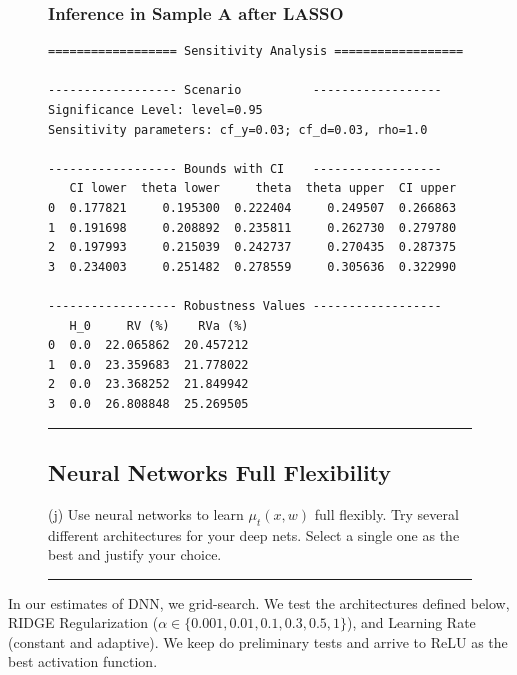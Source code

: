 \documentclass{article}
\newenvironment{colorparagraph}[1]{\par\color{#1}}{\par}
\begin{document}
\begin{figure}[H]
  \subsubsection*{Inference in Sample A after LASSO}
  \begin{lstlisting}[style=RstyleCommentSmall, caption=Sensitivity Analysis in Random Forest Estimate]
================== Sensitivity Analysis ==================

------------------ Scenario          ------------------
Significance Level: level=0.95
Sensitivity parameters: cf_y=0.03; cf_d=0.03, rho=1.0

------------------ Bounds with CI    ------------------
   CI lower  theta lower     theta  theta upper  CI upper
0  0.177821     0.195300  0.222404     0.249507  0.266863
1  0.191698     0.208892  0.235811     0.262730  0.279780
2  0.197993     0.215039  0.242737     0.270435  0.287375
3  0.234003     0.251482  0.278559     0.305636  0.322990

------------------ Robustness Values ------------------
   H_0     RV (%)    RVa (%)
0  0.0  22.065862  20.457212
1  0.0  23.359683  21.778022
2  0.0  23.368252  21.849942
3  0.0  26.808848  25.269505
  \end{lstlisting}
\end{figure}

\begin{figure}[H]
\begin{colorparagraph}{questioncolor}
\label{q3j}
\rule{\textwidth}{0.5pt}
\subsection{Neural Networks Full Flexibility}
(j) Use neural networks to learn \( \mu_t(x, w) \) full flexibly. Try several different architectures for your deep nets. Select a single one as the best and justify your choice.

\rule{\textwidth}{0.5pt}
\end{colorparagraph}

\begin{table}[H]
  \centering
  
  \label{tab:summary_of_validation_loss_by_architecture}
\end{table}
\end{figure}

In our estimates of DNN, we grid-search. We test the architectures defined below, RIDGE Regularization ($\alpha \in \{0.001, 0.01, 0.1, 0.3, 0.5, 1\}$), and Learning Rate (constant and adaptive). We keep do preliminary tests and arrive to ReLU as the best activation function.
\end{document}
